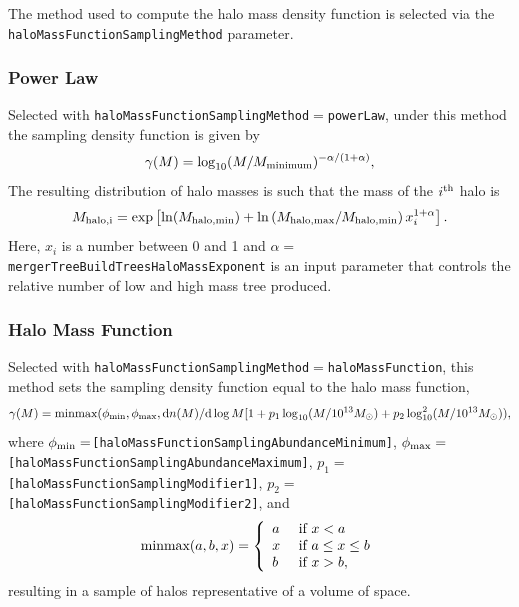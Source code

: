 The method used to compute the halo mass density function is selected via the {\tt haloMassFunctionSamplingMethod} parameter.

\subsubsection{Power Law}

Selected with {\tt haloMassFunctionSamplingMethod}$=${\tt powerLaw}, under this method the sampling density function is given by
\begin{equation}
\gamma(M) = \log_{10}(M/M_{\rm minimum})^{-\alpha/(1+\alpha)},
\end{equation}
The resulting distribution of halo masses is such that the mass of the $i^{\rm th}$ halo is
\begin{equation}
 M_{\rm halo,i} = \exp\left[ \ln(M_{\rm halo,min}) + \ln\left({M_{\rm halo,max}/M_{\rm halo,min}}\right) x_i^{1+\alpha} \right].
\end{equation}
Here, $x_i$ is a number between 0 and 1 and $\alpha=${\tt mergerTreeBuildTreesHaloMassExponent} is an input parameter that controls the relative number of low and high mass tree produced.

\subsubsection{Halo Mass Function}

Selected with {\tt haloMassFunctionSamplingMethod}$=${\tt haloMassFunction}, this method sets the sampling density function equal to the halo mass function,
\begin{equation}
\gamma(M) = \hbox{minmax}(\phi_{\rm min},\phi_{\rm max},{\rm d} n(M)/{\rm d}\log M [1 + p_1 \log_{10}(M/10^{13}M_\odot) + p_2 \log_{10}^2(M/10^{13}M_\odot)),
\end{equation}
 where $\phi_{\rm min}=${\tt [haloMassFunctionSamplingAbundanceMinimum]}, $\phi_{\rm max}=${\tt [haloMassFunctionSamplingAbundanceMaximum]}, $p_1=${\tt [haloMassFunctionSamplingModifier1]}, $p_2=${\tt [haloMassFunctionSamplingModifier2]}, and
\begin{equation}
 \hbox{minmax}(a,b,x) = \left\{\begin{array}{ll}a & \hbox{ if } x < a \\ x & \hbox{ if } a \leq x \leq b\\ b & \hbox{ if } x > b,\end{array}\right.
\end{equation}
resulting in a sample of halos representative of a volume of space.

